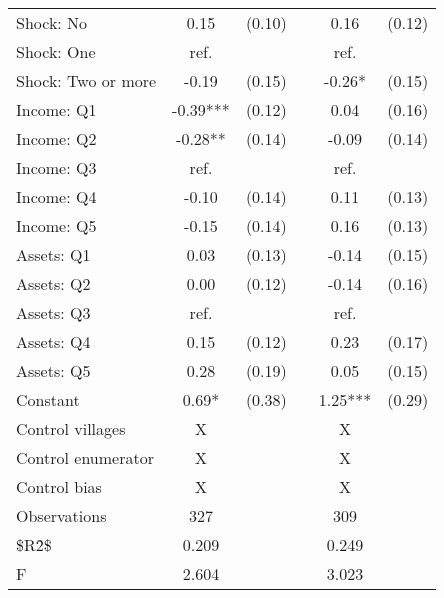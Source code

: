 \begin{table}[htbp]
{\begin{tabular}{lccccc}
    Shock: No & 0.15 & (0.10) &   & 0.16 & (0.12) \\
    Shock: One & ref. &   &   & ref. &  \\
    Shock: Two or more & -0.19 & (0.15) &   & -0.26* & (0.15) \\
    Income: Q1 & -0.39*** & (0.12) &   & 0.04 & (0.16) \\
    Income: Q2 & -0.28** & (0.14) &   & -0.09 & (0.14) \\
    Income: Q3 & ref. &   &   & ref. &  \\
    Income: Q4 & -0.10 & (0.14) &   & 0.11 & (0.13) \\
    Income: Q5 & -0.15 & (0.14) &   & 0.16 & (0.13) \\
    Assets: Q1 & 0.03 & (0.13) &   & -0.14 & (0.15) \\
    Assets: Q2 & 0.00 & (0.12) &   & -0.14 & (0.16) \\
    Assets: Q3 & ref. &   &   & ref. &  \\
    Assets: Q4 & 0.15 & (0.12) &   & 0.23 & (0.17) \\
    Assets: Q5 & 0.28 & (0.19) &   & 0.05 & (0.15) \\
    Constant & 0.69* & (0.38) &   & 1.25*** & (0.29) \\
    \midrule
    Control villages & X &   &   & X &  \\
    Control enumerator & X &   &   & X &  \\
    Control bias & X &   &   & X &  \\
    \midrule
    Observations & 327 &   &   & 309 &  \\
    \$R\^2\$ & 0.209 &   &   & 0.249 &  \\
    F & 2.604 &   &   & 3.023 &  \\
    \bottomrule
    \end{tabular}%
	}
  \label{tab:reg}%
\end{table}%
